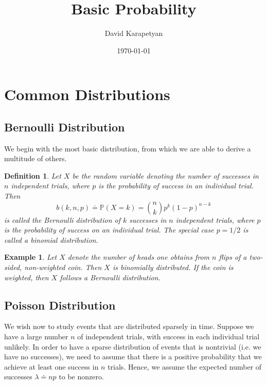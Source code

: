 \documentclass[12pt,reqno]{amsart}
\numberwithin{equation}{section}  %
\newtheorem{definition}[theorem]{Definition}
\newtheorem{example}{Example}[section]
\begin{document}
\title{Basic Probability}
\author{David Karapetyan}
\address{Department of Mathematics  \\
	University  of Rochester\\
		Rochester, NY 14607 }
		\date{\today}
		\maketitle
		\section{Common Distributions}
		\subsection{Bernoulli Distribution}
		We begin with the most basic distribution, from which
		we are able to derive a multitude of others.
	\begin{definition}
Let $X$ be the random variable denoting the number of successes
in $n$ independent trials, where $p$ is the probability of success in 
an individual trial. Then
\begin{equation*}
b(k, n, p) \doteq \mathbb{P}(X = k) = \binom{n}{k} p^k (1 - p)^{n-k}
\end{equation*}
is called the \emph{Bernoulli distribution} of $k$ successes
in $n$ independent trials, where $p$ is the probability of success on an
individual trial. The special case
$p = 1/2$ is called a \emph{binomial distribution}. 
\end{definition}
\begin{example}
Let $X$ denote the number of heads one obtains from $n$ flips of a
two-sided, non-weighted coin. Then $X$ is binomially distributed.
If the coin is weighted, then $X$ follows a Bernoulli distribution.
\end{example}
\subsection{Poisson Distribution}
We wish now to study events that are distributed sparsely in time.
Suppose we have a large number $n$ of independent trials, with
success in each individual trial unlikely. In order to have a sparse
distribution of events that is nontrivial (i.e. we have no successes),
we need to assume that there is a positive
probability that we achieve at least one success in $n$ trials. Hence, we assume the expected number of 
successes $\lambda \doteq np$ to be nonzero. 
\end{document}
